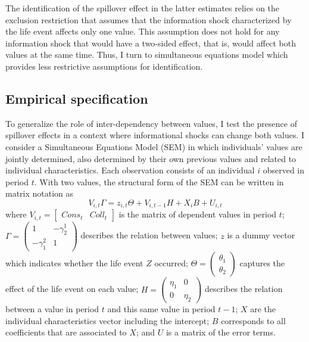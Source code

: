 The identification of the spillover effect in the latter estimates relies on the exclusion restriction that assumes that the information shock characterized by the life event affects only one value. This assumption does not hold for any information shock that would have a two-sided effect, that is, would affect both values at the same time. Thus, I turn to simultaneous equations model which provides less restrictive assumptions for identification.

\subsection{Empirical specification}

To generalize the role of inter-dependency between values, I test the presence of spillover effects in a context where informational shocks can change both values. I consider a Simultaneous Equations Model (SEM) in which individuals' values are jointly determined, also determined by their own previous values and related to individual characteristics. Each observation consists of an individual $i$ observed in period $t$.  With two values, the structural form of the SEM can be written in matrix notation as
\begin{equation}\label{chap3-eq:emp-structural}
    V_{i,t}\Gamma = z_{i,t} \Theta + V_{i,t-1}H + X_i B + U_{i,t}
\end{equation}
where $V_{i,t} = \begin{bmatrix}Cons_t & Coll_t\end{bmatrix}$ is the matrix of dependent values in period $t$; $\Gamma = \begin{pmatrix} 1 & -\gamma_2^1 \\ -\gamma_1^2 & 1 \end{pmatrix}$ describes the relation between values; $z$ is a dummy vector which indicates whether the life event $Z$ occurred; $\Theta = \begin{pmatrix}\theta_1 \\ \theta_2 \end{pmatrix}$ captures the effect of the life event on each value; $H = \begin{pmatrix} \eta_1 & 0 \\ 0 & \eta_2 \end{pmatrix}$ describes the relation between a value in period $t$ and this same value in period $t-1$; $X$ are the individual characteristics vector including the intercept; $B$ corresponds to all coefficients that are associated to $X$; and $U$ is a matrix of the error terms.

